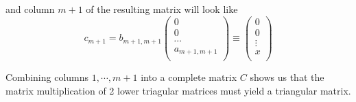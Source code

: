 \documentclass[12pt,a4paper,twoside]{article}
\begin{document}
and column $m+1$ of the resulting matrix will look like
\begin{equation}
c_{m+1}=b_{m+1,m+1}
\begin{pmatrix}
0 \\
0\\
\cdots \\
a_{m+1,m+1} \\
\end{pmatrix} \equiv
\begin{pmatrix}
0 \\
0\\ 
\vdots \\
x \\
\end{pmatrix}
\end{equation}

Combining columns $1, \cdots , m+1$ into a complete matrix $C$ shows us that the matrix multiplication of 2 lower triagular matrices must yield a triangular matrix. 
\end{document}
